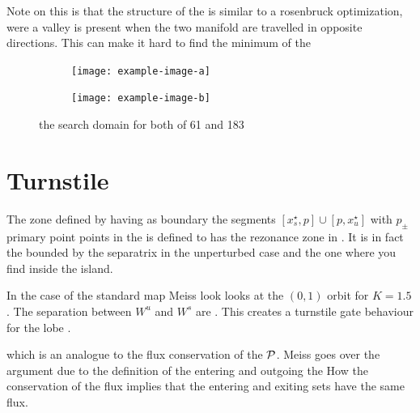 Note on this is that the structure of the is similar to a rosenbruck optimization, were a valley is present when the two manifold are travelled in opposite directions. This can make it hard to find the minimum of the 

\begin{figure}[H]
    \centering
    \begin{subfigure}[t]{0.49\textwidth}
        \centering
        \texttt{[image: example-image-a]}
        \caption{}
        \label{fig:}
    \end{subfigure}
    \hfill
    \begin{subfigure}[t]{0.49\textwidth}
        \centering
        \texttt{[image: example-image-b]}
        \caption{}
        \label{}
    \end{subfigure}
    \caption{the search domain for both of 61 and 183}
    \label{}
\end{figure}

\section{Turnstile}

The zone defined by having as boundary the segments $[x_s^\star,p]\cup[p,x_u^\star]$ with $p_\pm$ primary point points in the is defined to has the rezonance zone in \cite{meiss_thirty_2015}. It is in fact the bounded by the separatrix in the unperturbed case and the one where you find inside the island.

In the case of the standard map Meiss look looks at the $(0,1)$ orbit for $K=1.5$. The separation between $W^u$ and $W^s$ are . This creates a turnstile gate behaviour for the lobe .

which is an analogue to the flux conservation of the $\mathcal{P}$. Meiss goes over the argument due to the definition of the entering and outgoing the 
How the conservation of the flux implies that the entering and exiting sets have the same flux.

